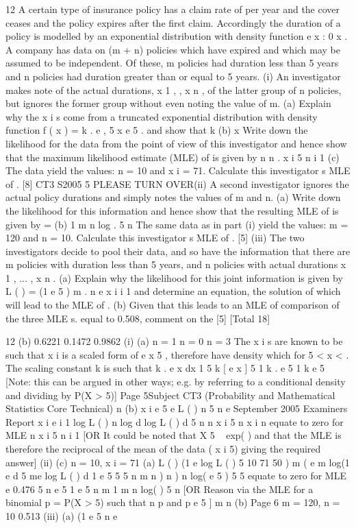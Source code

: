 \documentclass[a4paper,12pt]{article}
\begin{document}

\begin{enumerate}


12
A certain type of insurance policy has a claim rate of per year and the cover ceases
and the policy expires after the first claim. Accordingly the duration of a policy is
modelled by an exponential distribution with density function e x : 0 x
.
A company has data on (m + n) policies which have expired and which may be
assumed to be independent. Of these, m policies had duration less than 5 years and n
policies had duration greater than or equal to 5 years.
(i)
An investigator makes note of the actual durations, x 1 , , x n , of the latter
group of n policies, but ignores the former group without even noting the
value of m.
(a)
Explain why the x i s come from a truncated exponential distribution
with density function
f ( x ) = k . e
, 5
x
e 5 .
and show that k
(b)
x
Write down the likelihood for the data from the point of view of this
investigator and hence show that the maximum likelihood estimate
(MLE) of is given by
n
n
.
x i 5 n
i 1
(c)
The data yield the values: n = 10 and x i = 71. Calculate this
investigator s MLE of .
[8]
CT3 S2005
5
PLEASE TURN OVER(ii)
A second investigator ignores the actual policy durations and simply notes the
values of m and n.
(a)
Write down the likelihood for this information and hence show that the
resulting MLE of is given by
=
(b)
1
m n
log
.
5
n
The same data as in part (i) yield the values: m = 120 and n = 10.
Calculate this investigator s MLE of .
[5]
(iii)
The two investigators decide to pool their data, and so have the information
that there are m policies with duration less than 5 years, and n policies with
actual durations x 1 , ... , x n .
(a)
Explain why the likelihood for this joint information is given by
L ( ) = (1 e
5
) m .
n
e
x i
i 1
and determine an equation, the solution of which will lead to the MLE
of .
(b)
Given that this leads to an MLE of
comparison of the three MLE s.
equal to 0.508, comment on the
[5]
[Total 18]

12
(b) 0.6221
0.1472
0.9862
(i) (a)
n = 1
n = 0
n = 3
The x i s are known to be such that x i
is a scaled form of e
x
5 , therefore have density which
for 5 < x < .
The scaling constant k is such that
k . e
x
dx 1
5
k [ e
x
] 5
1
k . e
5
1
k
e 5
[Note: this can be argued in other ways; e.g. by referring to a
conditional density and dividing by P(X > 5)]
Page 5Subject CT3 (Probability and Mathematical Statistics Core Technical)
n
(b)
x i
e 5 e
L ( )
n 5 n
e
September 2005
Examiners Report
x i
e
i 1
log L ( )
n log
d
log L ( )
d
5 n
n
x i
5 n
x i
n
equate to zero for MLE
n
x i 5 n
i 1
[OR It could be noted that X 5 ~ exp( ) and that the MLE is
therefore the reciprocal of the mean of the data ( x i 5) giving the
required answer]
(ii)
(c) n = 10, x i = 71
(a) L ( ) (1 e
log L ( )
5
10
71 50
) m ( e
m log(1 e
d
5 me
log L ( )
d
1 e
5
5
5
n
m n
) n
) n log( e
5
)
5
5
equate to zero for MLE
e
0.476
5 n
e
5
1 e
5
n
m
1
m n
log(
)
5
n
[OR Reason via the MLE for a binomial p = P(X > 5) such that
n
p
and p e 5 ]
m n
(b)
Page 6
m = 120, n = 10
0.513
(iii)
(a)
(1 e
5
n
e


\end{enumerate}
\end{document}
